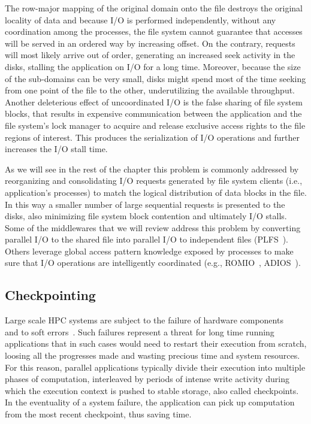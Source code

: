 The row-major mapping of the original domain onto the file destroys the original locality of data and because I/O is performed independently, without any coordination among the processes, the file system cannot guarantee that 
accesses will be served in an ordered way by increasing offset. On the contrary, requests will most likely arrive out of order, generating an increased seek activity in the disks, stalling the application on I/O for a long time. 
Moreover, because the size of the sub-domains can be very small, disks might spend most of the time seeking from one point of the file to the other, underutilizing the available throughput. Another deleterious effect of 
uncoordinated I/O is the false sharing of file system blocks, that results in expensive communication between the application and the file system's lock manager to acquire and release exclusive access rights to the file regions 
of interest. This produces the serialization of I/O operations and further increases the I/O stall time.

As we will see in the rest of the chapter this problem is commonly addressed by reorganizing and consolidating I/O requests generated by file system clients (i.e., application's processes) to match the logical distribution 
of data blocks in the file. In this way a smaller number of large sequential requests is presented to the disks, also minimizing file system block contention and ultimately I/O stalls. Some of the middlewares that we will 
review address this problem by converting parallel I/O to the shared file into parallel I/O to independent files (PLFS~\cite{Bent2009}). Others leverage global access pattern knowledge exposed by processes to make sure that I/O operations 
are intelligently coordinated (e.g., ROMIO~\cite{ThakurC96}, ADIOS~\cite{Lofstead2008}).

\subsection{Checkpointing}
Large scale HPC systems are subject to the failure of hardware components~\cite{Schroeder2006}~\cite{Schroeder2007} and to soft errors~\cite{Michalak2005}. Such failures represent a threat for long time running applications 
that in such cases would need to restart their execution from scratch, loosing all the progresses made and wasting precious time and system resources. For this reason, parallel applications typically divide their execution 
into multiple phases of computation, interleaved by periods of intense write activity during which the execution context is pushed to stable storage, also called checkpoints. In the eventuality of a system failure, the application 
can pick up computation from the most recent checkpoint, thus saving time. 

